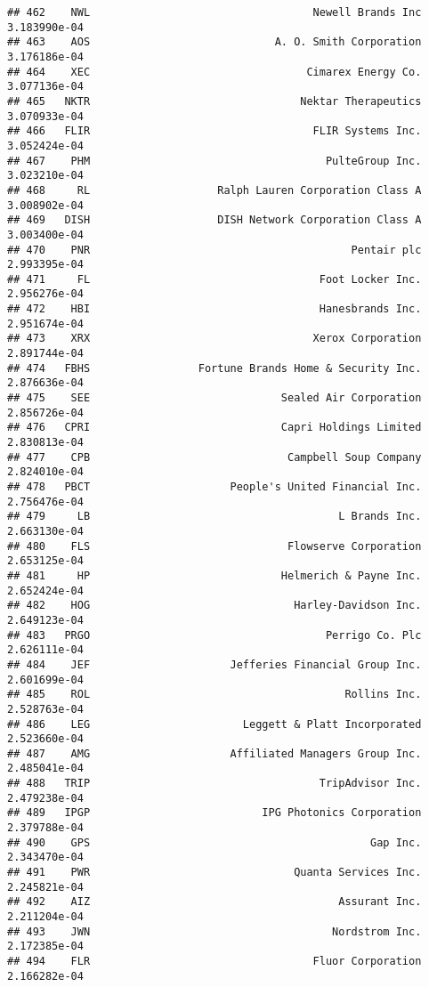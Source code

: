 \documentclass[
]{article}
\begin{document}
\begin{verbatim}
## 462    NWL                                   Newell Brands Inc 3.183990e-04
## 463    AOS                             A. O. Smith Corporation 3.176186e-04
## 464    XEC                                  Cimarex Energy Co. 3.077136e-04
## 465   NKTR                                 Nektar Therapeutics 3.070933e-04
## 466   FLIR                                   FLIR Systems Inc. 3.052424e-04
## 467    PHM                                     PulteGroup Inc. 3.023210e-04
## 468     RL                    Ralph Lauren Corporation Class A 3.008902e-04
## 469   DISH                    DISH Network Corporation Class A 3.003400e-04
## 470    PNR                                         Pentair plc 2.993395e-04
## 471     FL                                    Foot Locker Inc. 2.956276e-04
## 472    HBI                                    Hanesbrands Inc. 2.951674e-04
## 473    XRX                                   Xerox Corporation 2.891744e-04
## 474   FBHS                 Fortune Brands Home & Security Inc. 2.876636e-04
## 475    SEE                              Sealed Air Corporation 2.856726e-04
## 476   CPRI                              Capri Holdings Limited 2.830813e-04
## 477    CPB                               Campbell Soup Company 2.824010e-04
## 478   PBCT                      People's United Financial Inc. 2.756476e-04
## 479     LB                                       L Brands Inc. 2.663130e-04
## 480    FLS                               Flowserve Corporation 2.653125e-04
## 481     HP                              Helmerich & Payne Inc. 2.652424e-04
## 482    HOG                                Harley-Davidson Inc. 2.649123e-04
## 483   PRGO                                     Perrigo Co. Plc 2.626111e-04
## 484    JEF                      Jefferies Financial Group Inc. 2.601699e-04
## 485    ROL                                        Rollins Inc. 2.528763e-04
## 486    LEG                        Leggett & Platt Incorporated 2.523660e-04
## 487    AMG                      Affiliated Managers Group Inc. 2.485041e-04
## 488   TRIP                                    TripAdvisor Inc. 2.479238e-04
## 489   IPGP                           IPG Photonics Corporation 2.379788e-04
## 490    GPS                                            Gap Inc. 2.343470e-04
## 491    PWR                                Quanta Services Inc. 2.245821e-04
## 492    AIZ                                       Assurant Inc. 2.211204e-04
## 493    JWN                                      Nordstrom Inc. 2.172385e-04
## 494    FLR                                   Fluor Corporation 2.166282e-04

\end{verbatim}
\end{document}
